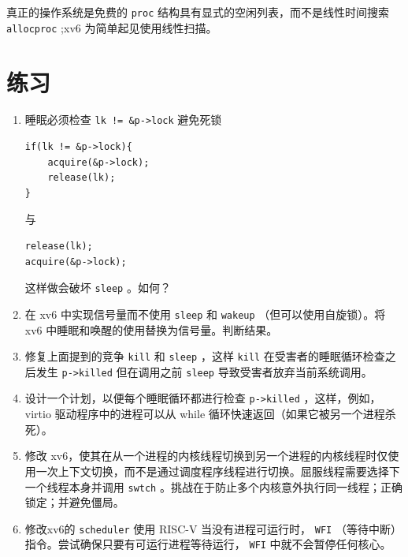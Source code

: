 真正的操作系统是免费的
    \lstinline{proc}    结构具有显式的空闲列表，而不是线性时间搜索
    \lstinline{allocproc}    ;xv6 为简单起见使用线性扫描。
    \section{练习  }     

   \begin{enumerate}

 
   \item   睡眠必须检查
    \lstinline{lk != &p->lock}    避免死锁
\begin{lstlisting}[]
if(lk != &p->lock){
    acquire(&p->lock);
    release(lk);
}
\end{lstlisting}    与
\begin{lstlisting}[]
release(lk);
acquire(&p->lock);
\end{lstlisting}    这样做会破坏
    \lstinline{sleep}    。如何？   \item   在 xv6 中实现信号量而不使用
    \lstinline{sleep}    和    \lstinline{wakeup}   （但可以使用自旋锁）。将 xv6 中睡眠和唤醒的使用替换为信号量。判断结果。   \item   修复上面提到的竞争
    \lstinline{kill}    和
    \lstinline{sleep}    ，这样
    \lstinline{kill}    在受害者的睡眠循环检查之后发生
    \lstinline{p->killed}    但在调用之前
    \lstinline{sleep}    导致受害者放弃当前系统调用。   \item   设计一个计划，以便每个睡眠循环都进行检查
    \lstinline{p->killed}   ，这样，例如，virtio 驱动程序中的进程可以从 while 循环快速返回（如果它被另一个进程杀死）。   \item   修改 xv6，使其在从一个进程的内核线程切换到另一个进程的内核线程时仅使用一次上下文切换，而不是通过调度程序线程进行切换。屈服线程需要选择下一个线程本身并调用    \texttt{swtch}    。挑战在于防止多个内核意外执行同一线程；正确锁定；并避免僵局。   \item   修改xv6的
    \lstinline{scheduler}    使用 RISC-V
 当没有进程可运行时，   \lstinline{WFI}   （等待中断）指令。尝试确保只要有可运行进程等待运行，   \texttt{WFI}    中就不会暂停任何核心。  \end{enumerate}     

